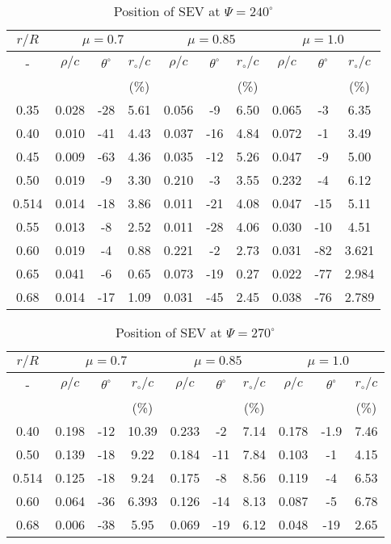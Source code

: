 \documentclass[%
 reprint,
 showkeys,
 amsmath,amssymb,
 aps,
]{revtex4-1}
\begin{document}
\begin{table}[!ht]
	\centering
	\caption{Position of SEV at $\Psi = 240^{\circ}$}
	\begin{tabular}{ |c||c|c|c|c|c|c|c|c|c| }
		\hline
		\multicolumn{1}{|c||}{$r/R$} & \multicolumn{3}{c}{$\mu = 0.7$} & \multicolumn{3}{|c}{$\mu = 0.85$} & \multicolumn{3}{|c|}{$\mu = 1.0$} \\
		\hline
		- & $\rho/c$ & ${\theta}^\circ $ & $r_{\circ}/c$ & $\rho/c$ & ${\theta}^\circ  $ & $r_{\circ}/c$ & $\rho/c$ & ${\theta}^\circ $ & $r_{\circ}/c$ \\
		  & & & (\%)& & & (\%)& & & (\%)\\
		\hline
		0.35 & 0.028 & -28 & 5.61 & 0.056 & -9 & 6.50 & 0.065 & -3 & 6.35 \\
		0.40 & 0.010 & -41 & 4.43 & 0.037 & -16& 4.84 & 0.072 & -1 & 3.49\\
		0.45 & 0.009 & -63 & 4.36 & 0.035 & -12& 5.26 & 0.047 & -9 & 5.00 \\
		0.50 & 0.019 & -9  & 3.30 & 0.210 & -3 & 3.55 & 0.232 & -4 & 6.12\\
		0.514& 0.014 & -18  & 3.86& 0.011 & -21& 4.08 & 0.047 & -15 & 5.11\\
		0.55 & 0.013 & -8  & 2.52 & 0.011 & -28& 4.06 & 0.030 & -10 & 4.51\\
		0.60 & 0.019 & -4  & 0.88 & 0.221 & -2 & 2.73 & 0.031 & -82 & 3.621\\
		0.65 & 0.041 & -6  & 0.65 & 0.073 & -19& 0.27 & 0.022 & -77 & 2.984\\
		0.68 & 0.014 & -17 & 1.09 & 0.031 & -45& 2.45 & 0.038 &
		-76 & 2.789\\
		\hline
	\end{tabular}
	
	\label{Tab:SevPositionAz240}
\end{table}

\begin{table}[!ht]
	\centering
	\caption{Position of SEV at $\Psi = 270^{\circ}$}
	\begin{tabular}{ |c||c|c|c|c|c|c|c|c|c| }
		\hline
		\multicolumn{1}{|c||}{$r/R$} & \multicolumn{3}{c}{$\mu = 0.7$} & \multicolumn{3}{|c}{$\mu = 0.85$} & \multicolumn{3}{|c|}{$\mu = 1.0$} \\
		\hline
		- & $\rho/c$ & ${\theta}^\circ$ & $r_{\circ}/c$ & $\rho/c$ & ${\theta}^\circ $ & $r_{\circ}/c$ & $\rho/c$ & ${\theta}^\circ $ & $r_{\circ}/c$ \\
		 & & & (\%)& & & (\%)& & & (\%)\\
		\hline
		0.40 & 0.198 & -12 & 10.39 & 0.233 & -2	& 7.14 & 0.178 & -1.9 & 7.46\\
		0.50 & 0.139 & -18  & 9.22 & 0.184 & -11 & 7.84 & 0.103 & -1 & 4.15\\
		0.514& 0.125 & -18  & 9.24& 0.175 & -8 & 8.56 & 0.119 & -4 & 6.53\\
		0.60 & 0.064 & -36  & 6.393 & 0.126 & -14 & 8.13 & 0.087 & -5 & 6.78\\
		0.68 & 0.006 & -38 & 5.95 & 0.069 & -19& 6.12 & 0.048 &
		-19 & 2.65\\
		\hline
	\end{tabular}
	
	\label{Tab:SevPositionAz270}
\end{table}
\end{document}
